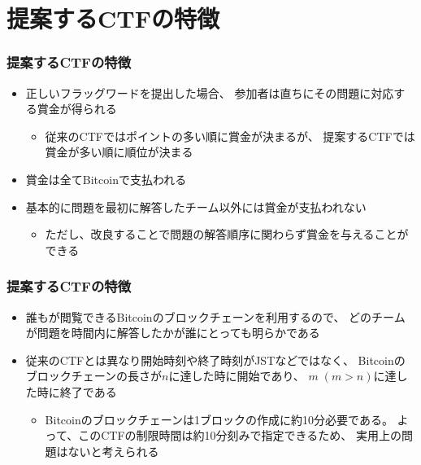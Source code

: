\section{提案するCTFの特徴}

\begin{frame}
  \frametitle{提案するCTFの特徴}

  \pause
  \begin{itemize}
    \item<+-> 正しいフラッグワードを提出した場合、
    参加者は直ちにその問題に対応する賞金が得られる
    \begin{itemize}
      \item<+-> 従来のCTFではポイントの多い順に賞金が決まるが、
      提案するCTFでは賞金が多い順に順位が決まる
    \end{itemize}

    \item<+-> 賞金は全てBitcoinで支払われる

    \item<+-> 基本的に問題を最初に解答したチーム以外には賞金が支払われない
    \begin{itemize}
      \item ただし、改良することで問題の解答順序に関わらず賞金を与えることができる
    \end{itemize}
  \end{itemize}
\end{frame}

\begin{frame}
  \frametitle{提案するCTFの特徴}

  \begin{itemize}
    \item<+-> 誰もが閲覧できるBitcoinのブロックチェーンを利用するので、
    どのチームが問題を時間内に解答したかが誰にとっても明らかである

    \item<+-> 従来のCTFとは異なり開始時刻や終了時刻がJSTなどではなく、
    Bitcoinのブロックチェーンの長さが$n$に達した時に開始であり、
    $m\;(m > n)$に達した時に終了である
    \begin{itemize}
      \item Bitcoinのブロックチェーンは1ブロックの作成に約10分必要である。
      よって、このCTFの制限時間は約10分刻みで指定できるため、
      実用上の問題はないと考えられる
    \end{itemize}
  \end{itemize}
\end{frame}

